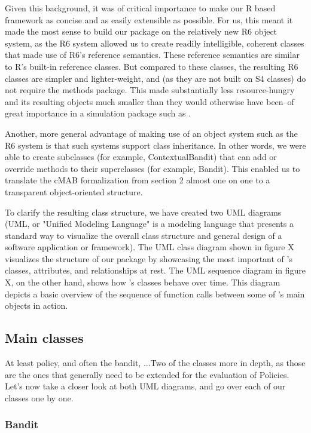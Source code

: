 \documentclass[nojss]{jss}\usepackage[]{graphicx}\usepackage[]{color}
\begin{document}
Given this background, it was of critical importance to make our R based framework as concise and as easily extensible as possible. For us, this meant it made the most sense to build our package on the relatively new R6 object system, as the R6 system allowed us to create readily intelligible, coherent classes that made use of R6's reference semantics. These reference semantics are similar to R's built-in reference classes. But compared to these classes, the resulting R6 classes are simpler and lighter-weight, and (as they are not built on S4 classes) do not require the methods package. This made  substantially less resource-hungry and its resulting objects much smaller than they would otherwise have been--of great importance in a simulation package such as .

Another, more general advantage of making use of an object system such as the R6 system is that such systems support class inheritance. In other words, we were able to create subclasses (for example, ContextualBandit) that can add or override methods to their superclasses (for example, Bandit). This enabled us to translate the cMAB formalization from section 2 almost one on one to a transparent object-oriented structure.

To clarify the resulting class structure, we have created two UML diagrams (UML, or "Unified Modeling Language" is a modeling language that presents a standard way to visualize the overall class structure and general design of a software application or framework). The UML class diagram shown in figure X visualizes the structure of our package by showcasing the most important of 's classes, attributes, and relationships at rest. The UML sequence diagram in figure X, on the other hand, shows how 's classes behave over time. This diagram depicts a basic overview of the sequence of function calls between some of 's main objects in action.


\subsection{Main classes}

At least policy, and often the bandit, ...Two of the classes more in depth, as those are the ones that generally need to be extended for the evaluation of Policies. Let's now take a closer look at both UML diagrams, and go over each of our classes one by one.

\subsubsection{Bandit}
\end{document}
